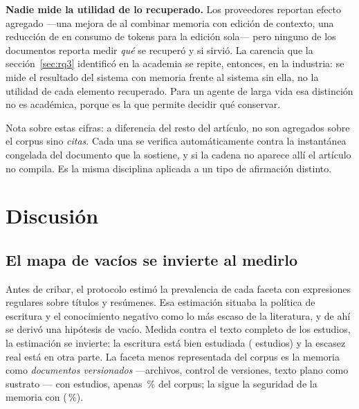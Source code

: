 \documentclass[conference]{IEEEtran}
\begin{document}
\textbf{Nadie mide la utilidad de lo recuperado.} Los proveedores reportan efecto agregado —una mejora
de \clGrisMejoraCombinada{} al combinar memoria con edición de contexto, una reducción de
\clGrisAhorroTokens{} en consumo de tokens para la edición sola— pero ninguno de los \clGrisDocs{}
documentos reporta medir \emph{qué} se recuperó y si sirvió. La carencia que la
sección~\ref{sec:rq3} identificó en la academia se repite, entonces, en la industria: se mide el
resultado del sistema con memoria frente al sistema sin ella, no la utilidad de cada elemento
recuperado. Para un agente de larga vida esa distinción no es académica, porque es la que permite
decidir qué conservar.

Nota sobre estas cifras: a diferencia del resto del artículo, no son agregados sobre el corpus sino
\emph{citas}. Cada una se verifica automáticamente contra la instantánea congelada del documento que
la sostiene, y si la cadena no aparece allí el artículo no compila. Es la misma disciplina aplicada a
un tipo de afirmación distinto.

\section{Discusión}
\label{sec:discussion}

\subsection{El mapa de vacíos se invierte al medirlo}
\label{sec:disc-gaps}

Antes de cribar, el protocolo estimó la prevalencia de cada faceta con expresiones regulares sobre
títulos y resúmenes. Esa estimación situaba la política de escritura y el conocimiento negativo como
lo más escaso de la literatura, y de ahí se derivó una hipótesis de vacío. Medida contra el texto
completo de los \clCarAnalizados{} estudios, la estimación se invierte: la escritura está bien
estudiada (\clMFwrite{} estudios) y la escasez real está en otra parte. La faceta menos representada
del corpus es la memoria como \emph{documentos versionados} —archivos, control de versiones,
texto plano como sustrato \cite{cW4416548137,cW7160652332}— con \clMFdocsVersionado{} estudios, apenas
\clMFdocsVersionadoPct{}\,\% del corpus; la sigue la seguridad de la memoria con \clRQseisSeguridad{}
(\clRQseisSeguridadPct{}\,\%).
\end{document}
